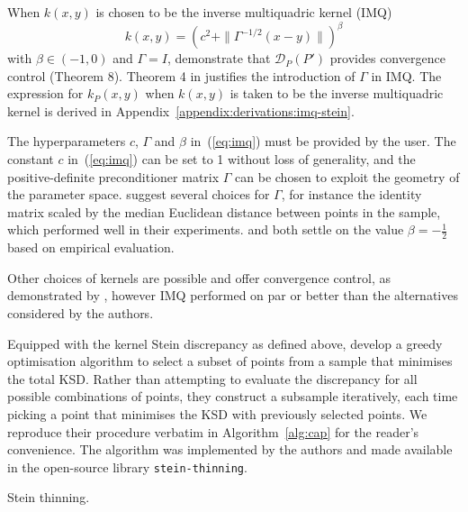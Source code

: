 \documentclass[11pt,a4paper]{report}
\DeclareMathOperator*{\argmin}{arg\,min}
\begin{document}
When $k(x, y)$ is chosen to be the inverse multiquadric kernel (IMQ)
\begin{equation}
k(x, y) = \left(c^2 + \|\Gamma^{-1/2}(x-y)\|\right)^\beta
\label{eq:imq}
\end{equation}
with $\beta \in (-1, 0)$ and $\Gamma = I$, \cite{gorhamMeasuringSampleQuality2017} demonstrate that $\mathcal{D}_{P}(P')$ provides convergence control (Theorem 8). Theorem 4 in \cite{chenSteinPointMarkov2019} justifies the introduction of $\Gamma$ in IMQ. The expression for $k_P(x, y)$ when $k(x, y)$ is taken to be the inverse multiquadric kernel is derived in Appendix~\ref{appendix:derivations:imq-stein}.

The hyperparameters $c$, $\Gamma$ and $\beta$ in~(\ref{eq:imq}) must be provided by the user. The constant $c$ in~(\ref{eq:imq}) can be set to 1 without loss of generality, and the positive-definite preconditioner matrix $\Gamma$ can be chosen to exploit the geometry of the parameter space. \cite{riabizOptimalThinningMCMC2022} suggest several choices for $\Gamma$, for instance the identity matrix scaled by the median Euclidean distance between points in the sample, which performed well in their experiments. \cite{gorhamMeasuringSampleQuality2017} and \cite{riabizOptimalThinningMCMC2022} both settle on the value $\beta = -\frac12$ based on empirical evaluation.

Other choices of kernels are possible and offer convergence control, as demonstrated by \cite{chenSteinPoints2018}, however IMQ performed on par or better than the alternatives considered by the authors.

Equipped with the kernel Stein discrepancy as defined above, \cite{riabizOptimalThinningMCMC2022} develop a greedy optimisation algorithm to select a subset of points from a sample that minimises the total KSD. Rather than attempting to evaluate the discrepancy for all possible combinations of points, they construct a subsample iteratively, each time picking a point that minimises the KSD with previously selected points. We reproduce their procedure verbatim in Algorithm~\ref{alg:cap} for the reader's convenience. The algorithm was implemented by the authors and made available in the open-source library \texttt{stein-thinning}.

\begin{algorithm}[t]
\caption{Stein thinning.}\label{alg:cap}

\For{$j = 1, \dots, m$}{
$$\pi(j) \in \argmin_{i=1,\dots,n} \frac{k_P(x_i, x_i)}{2} + \sum_{j'=1}^{j-1} k_P(x_{\pi(j')}, x_i)$$
}
\end{algorithm}
\end{document}
